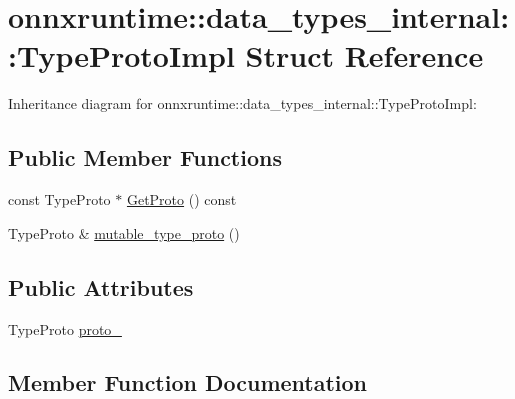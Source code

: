 \hypertarget{structonnxruntime_1_1data__types__internal_1_1TypeProtoImpl}{}\section{onnxruntime\+:\+:data\+\_\+types\+\_\+internal\+:\+:Type\+Proto\+Impl Struct Reference}
\label{structonnxruntime_1_1data__types__internal_1_1TypeProtoImpl}


Inheritance diagram for onnxruntime\+:\+:data\+\_\+types\+\_\+internal\+:\+:Type\+Proto\+Impl\+:
\subsection*{Public Member Functions}
\begin{DoxyCompactItemize}
\item 
const Type\+Proto $\ast$ \mbox{\hyperlink{structonnxruntime_1_1data__types__internal_1_1TypeProtoImpl_ac293bed96357f496aaa169bf72ddd6db}{Get\+Proto}} () const
\item 
Type\+Proto \& \mbox{\hyperlink{structonnxruntime_1_1data__types__internal_1_1TypeProtoImpl_a6eddc645e0fe5023894905ef469c31c7}{mutable\+\_\+type\+\_\+proto}} ()
\end{DoxyCompactItemize}
\subsection*{Public Attributes}
\begin{DoxyCompactItemize}
\item 
Type\+Proto \mbox{\hyperlink{structonnxruntime_1_1data__types__internal_1_1TypeProtoImpl_ad374e3214b55ee8d920fd86e9c6610d9}{proto\+\_\+}}
\end{DoxyCompactItemize}


\subsection{Member Function Documentation}
\mbox{\label{structonnxruntime_1_1data__types__internal_1_1TypeProtoImpl_ac293bed96357f496aaa169bf72ddd6db}} 
